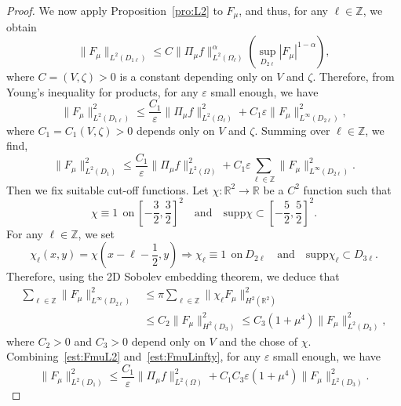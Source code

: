 \documentclass[a4paper,reqno]{amsart}
\theoremstyle{definition}
\numberwithin{equation}{section}
\newcommand{\R}{\mathbb{R}}
\def \R {{\mathbb{R} }}
\begin{document}
\begin{proof}
We now apply Proposition~\ref{pro:L2} to $F_{\mu}$, and thus, for any $\ell\in \mathbb{Z}$, we obtain
\begin{equation*}
\|F_{\mu}\|_{L^{2}(D_{1\ell})}\le C\|\Pi_{\mu}f\|_{L^{2}(\Omega_{\ell})}^{\alpha}\left(\sup_{D_{2\ell}}|F_{\mu}|^{1-\alpha}\right),
\end{equation*}
where $C=(V,\zeta)>0$ is a constant depending only on $V$ and $\zeta$.
Therefore, from Young's inequality for products, for any $\varepsilon$ small enough, we have
\begin{equation*}
\|F_{\mu}\|^{2}_{L^{2}(D_{1\ell})}\le \frac{C_{1}}{\varepsilon}\|\Pi_{\mu}f\|^{2}_{L^{2}(\Omega_{\ell})}+C_{1}\varepsilon\|F_{\mu}\|^{2}_{L^{\infty}{(D_{2\ell})}},
\end{equation*}
where $C_{1}=C_{1}(V,\zeta)>0$ depends only on $V$ and $\zeta$. Summing over $\ell\in \mathbb{Z}$, we find,
\begin{equation}\label{est:FmuL2}
\|F_{\mu}\|^{2}_{L^{2}(D_{1})}\le \frac{C_{1}}{\varepsilon}\|\Pi_{\mu}f\|^{2}_{L^{2}(\Omega)}+C_{1}\varepsilon\sum_{\ell\in \mathbb{Z}}\|F_{\mu}\|^{2}_{L^{\infty}{(D_{2\ell})}}.
    \end{equation}
Then we fix suitable cut-off functions. Let $\chi:\R^{2}\to \R$ be a $C^{2}$ function such that 
\begin{equation*}
    \chi\equiv 1\ \ \mbox{on}\ \left[-\frac{3}{2},\frac{3}{2}\right]^{2}\quad \mbox{and}\quad \mbox{supp}\chi\subset \left[-\frac{5}{2},\frac{5}{2}\right]^{2}.
    \end{equation*}
    For any $\ell\in \mathbb{Z}$, we set 
    \begin{equation*}
        \chi_{\ell}(x,y)=\chi\left(x-\ell-\frac{1}{2},y\right)
        \Longrightarrow \chi_{\ell}\equiv 1\ \ \mbox{on}\ D_{2\ell}\quad \mbox{and}\quad \mbox{supp}\chi_{\ell}\subset D_{3\ell}.
    \end{equation*}
    Therefore, using the 2D Sobolev embedding theorem, we deduce that 
    \begin{equation}\label{est:FmuLinfty}
        \begin{aligned}
\sum_{\ell\in \mathbb{Z}}\|F_{\mu}\|^{2}_{L^{\infty}(D_{2\ell})}
&\le \pi\sum_{\ell\in \mathbb{Z}}\|\chi_{\ell} F_{\mu}\|^{2}_{H^{2}(\R^{2})}\\
&\le {{C}_{2}}\|F_{\mu}\|^{2}_{H^{2}(D_{3})}\le C_{3}(1+\mu^{4})\|F_{\mu}\|^{2}_{L^{2}(D_{3})},
\end{aligned}    
\end{equation}
where ${C}_{2}>0$ and $C_{3}>0$ depend only on $V$ and the chose of $\chi$.
Combining~\eqref{est:FmuL2} and~\eqref{est:FmuLinfty}, for any $\varepsilon$ small enough, we have 
\begin{equation*}
\|F_{\mu}\|^{2}_{L^{2}(D_{1})}\le \frac{C_{1}}{\varepsilon}\|\Pi_{\mu}f\|_{L^{2}(\Omega)}^{2}+C_{1}C_{3}\varepsilon(1+\mu^{4})\|F_{\mu}\|_{L^{2}(D_{3})}^{2}.
\end{equation*}


\end{proof}
\end{document}
